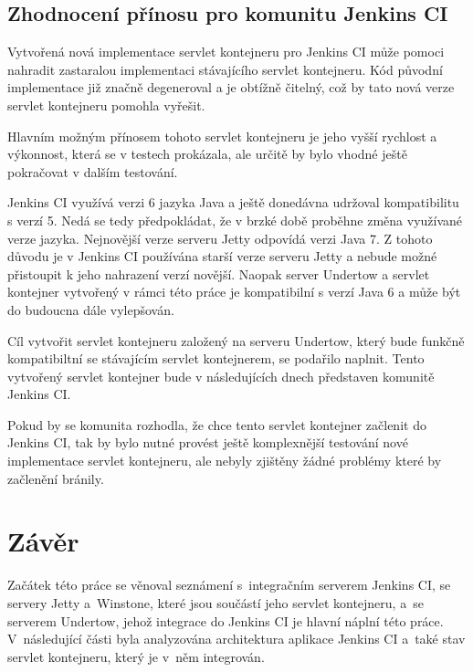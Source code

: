     \section{Zhodnocení přínosu pro komunitu Jenkins CI} \label{kapPrinos}
        Vytvořená nová implementace servlet kontejneru pro Jenkins CI
        může pomoci nahradit zastaralou implementaci stávajícího servlet kontejneru.
        Kód původní implementace již značně degeneroval
        a je obtížně čitelný, což by tato nová verze servlet kontejneru pomohla vyřešit.

        Hlavním možným přínosem tohoto servlet kontejneru je jeho vyšší
        rychlost a výkonnost, která se v testech prokázala, ale
        určitě by bylo vhodné ještě pokračovat v dalším testování.

        Jenkins CI využívá verzi 6 jazyka Java a ještě donedávna
        udržoval kompatibilitu s verzí 5. Nedá se tedy předpokládat,
        že v brzké době proběhne změna využívané verze jazyka.
        Nejnovější verze serveru Jetty odpovídá verzi Java 7.
        Z tohoto důvodu je v Jenkins CI používána
        starší verze serveru Jetty a nebude možné přistoupit k jeho
        nahrazení verzí novější.
        Naopak server Undertow a servlet kontejner vytvořený v rámci této práce
        je kompatibilní s verzí Java 6
        a může být do budoucna dále vylepšován. 

        Cíl vytvořit servlet kontejneru založený na serveru Undertow, který bude
        funkčně kompatibiltní se stávajícím servlet kontejnerem, se podařilo
        naplnit. Tento vytvořený servlet kontejner bude v následujících dnech
        představen komunitě Jenkins CI.
    
        Pokud by se komunita rozhodla, že chce tento servlet kontejner
        začlenit do Jenkins CI, tak by bylo nutné provést ještě
        komplexnější testování nové implementace servlet kontejneru, 
        ale nebyly zjištěny žádné
        problémy které by začlenění bránily.
    


\chapter{Závěr}
    Začátek této práce se věnoval seznámení s~integračním serverem Jenkins CI,
    se servery Jetty a~Winstone, které jsou součástí jeho servlet kontejneru,
    a~se serverem Undertow, jehož integrace do Jenkins CI je hlavní
    náplní této práce. V~následující části byla analyzována architektura aplikace Jenkins CI
    a~také stav servlet kontejneru, který je v~něm integrován.

